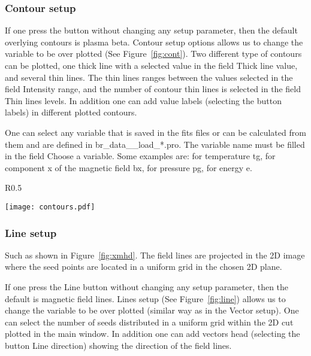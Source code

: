 \documentclass[12pt,preprint]{aastex}
\begin{document}
\subsubsection{Contour setup}

If one press the button without changing any setup parameter, then the default overlying contours 
is plasma beta. Contour setup options allows us to change the variable to be over plotted 
(See Figure~\ref{fig:cont}). Two 
different type of contours can be plotted, one thick line with a selected value in the 
field Thick line value, and several thin lines. The thin lines ranges between the values 
selected in the field Intensity range, and the number of contour thin lines is selected in the 
field Thin lines levels. In addition one can add value labels (selecting the button labels) in 
different plotted contours. 

One can select any variable that is saved in the fits files or can be calculated from 
them and are defined in br\_data\_\_load\_*.pro. The variable name must
be filled in the field Choose a variable. Some examples are: for temperature tg, for
component x of the magnetic field bx, for pressure pg, for energy e. 


\begin{wrapfigure}{R}{0.5\textwidth}
\vspace{-1.cm}
\begin{center}
	\texttt{[image: contours.pdf]}
\end{center}
\vspace{-0.56cm}
\caption{\label{fig:cont} Screenshot of the Contours setup.}
\vspace{-1.cm}
\end{wrapfigure}

\subsubsection{Line setup}

Such as shown in Figure~\ref{fig:xmhd}. The field lines are projected in the 2D image where the seed 
points are located in a uniform grid in the chosen 2D plane. 

If one press the Line button without changing any setup parameter, then the default is 
magnetic field lines. Lines setup (See Figure~\ref{fig:line}) allows us to change the variable 
to be over plotted (similar 
way as in the Vector setup). One can select the number of seeds distributed in a uniform grid
within the 2D cut plotted in the main window. 
In addition one can add vectors head (selecting the button Line direction) showing the direction 
of the field lines. 
\end{document}
